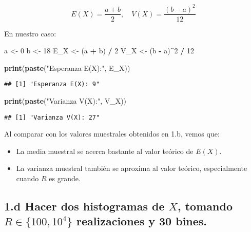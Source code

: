 \documentclass[
]{article}
\newenvironment{Shaded}{\begin{snugshade}}{\end{snugshade}}
\newcommand{\DecValTok}[1]{\textcolor[rgb]{0.00,0.00,0.81}{#1}}
\newcommand{\FunctionTok}[1]{\textcolor[rgb]{0.13,0.29,0.53}{\textbf{#1}}}
\newcommand{\NormalTok}[1]{#1}
\newcommand{\OtherTok}[1]{\textcolor[rgb]{0.56,0.35,0.01}{#1}}
\newcommand{\SpecialCharTok}[1]{\textcolor[rgb]{0.81,0.36,0.00}{\textbf{#1}}}
\newcommand{\StringTok}[1]{\textcolor[rgb]{0.31,0.60,0.02}{#1}}
\providecommand{\tightlist}{%
  \setlength{\itemsep}{0pt}\setlength{\parskip}{0pt}}
\begin{document}
\[
E(X) = \frac{a + b}{2}, \quad V(X) = \frac{(b - a)^2}{12}
\]

En nuestro caso:

\begin{Shaded}
\begin{Highlighting}[]
\NormalTok{a }\OtherTok{\textless{}{-}} \DecValTok{0}
\NormalTok{b }\OtherTok{\textless{}{-}} \DecValTok{18}
\NormalTok{E\_X }\OtherTok{\textless{}{-}}\NormalTok{ (a }\SpecialCharTok{+}\NormalTok{ b) }\SpecialCharTok{/} \DecValTok{2}
\NormalTok{V\_X }\OtherTok{\textless{}{-}}\NormalTok{ (b }\SpecialCharTok{{-}}\NormalTok{ a)}\SpecialCharTok{\^{}}\DecValTok{2} \SpecialCharTok{/} \DecValTok{12}

\FunctionTok{print}\NormalTok{(}\FunctionTok{paste}\NormalTok{(}\StringTok{"Esperanza E(X):"}\NormalTok{, E\_X))}
\end{Highlighting}
\end{Shaded}

\begin{verbatim}
## [1] "Esperanza E(X): 9"
\end{verbatim}

\begin{Shaded}
\begin{Highlighting}[]
\FunctionTok{print}\NormalTok{(}\FunctionTok{paste}\NormalTok{(}\StringTok{"Varianza V(X):"}\NormalTok{, V\_X))}
\end{Highlighting}
\end{Shaded}

\begin{verbatim}
## [1] "Varianza V(X): 27"
\end{verbatim}

Al comparar con los valores muestrales obtenidos en 1.b, vemos que:

\begin{itemize}
\tightlist
\item
  La media muestral se acerca bastante al valor teórico de \(E(X)\).
\item
  La varianza muestral también se aproxima al valor teórico,
  especialmente cuando \(R\) es grande.
\end{itemize}

\subsection{\texorpdfstring{1.d Hacer dos histogramas de \(X\), tomando
\(R \in \{100, 10^4\}\) realizaciones y 30
bines.}{1.d Hacer dos histogramas de X, tomando R \textbackslash in \textbackslash\{100, 10\^{}4\textbackslash\} realizaciones y 30 bines.}}\label{d-hacer-dos-histogramas-de-x-tomando-r-in-100-104-realizaciones-y-30-bines.}
\end{document}
